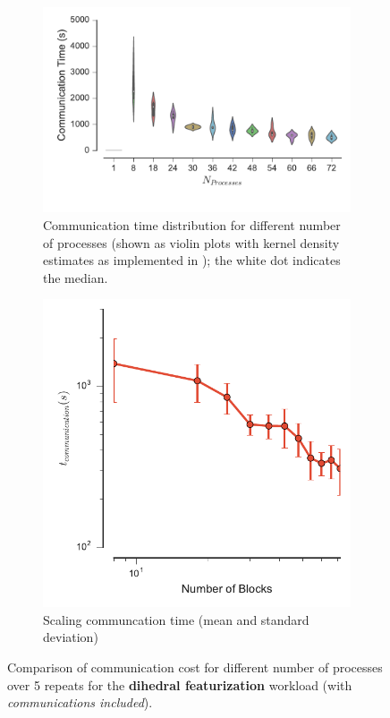 \begin{figure}[tbp]
\centering
\begin{subfigure} {.55\textwidth}
  \centering
  \includegraphics[width=\linewidth]{figs/ViolinPlot-Ncores-comparison-comm-dihedral.pdf}
  \caption{Communication time distribution for different number of
    processes (shown as violin plots \protect\citep{Hintze:1998tw}
    with kernel density estimates as implemented in
    ); the white dot indicates the median.}
\end{subfigure}
\hfill
\begin{subfigure}{.35\textwidth}
  \centering
  \includegraphics[width=\linewidth]{figs/t_comm-mean-dihedral.pdf}
  \caption{Scaling communcation time (mean and standard deviation)}
\end{subfigure}
\caption{Comparison of communication cost for different number of
  processes over 5 repeats for the \textbf{dihedral featurization}
  workload (with \emph{communications included}).}
\label{fig:comparison-t_comm-dihedral}
\end{figure}

